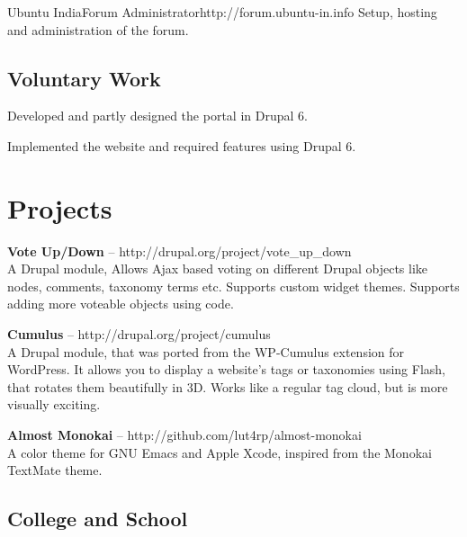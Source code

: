 \documentclass[11pt,a4paper]{moderncv}
\begin{document}
{Ubuntu India}{Forum Administrator}{}{http://forum.ubuntu-in.info}
{Setup, hosting and administration of the forum.}

\subsection{Voluntary Work}

{Developed and partly designed the portal in Drupal 6.}

{Implemented the website and required features using Drupal 6.}



\pagebreak
\section{Projects}

\cvlistitem
{\textbf{Vote Up/Down} -- {\small http://drupal.org/project/vote\_up\_down}
  \\A Drupal module, Allows Ajax based voting on different Drupal objects like nodes, comments, taxonomy terms etc. Supports custom widget themes. Supports adding more voteable objects using code.\\
}

\cvlistitem
{\textbf{Cumulus} -- {\small http://drupal.org/project/cumulus}
  \\A Drupal module, that was ported from the WP-Cumulus extension for WordPress. It allows you to display a website's tags or taxonomies using Flash, that rotates them beautifully in 3D. Works like a regular tag cloud, but is more visually exciting.\\
}

\cvlistitem
{\textbf{Almost Monokai} -- {\small http://github.com/lut4rp/almost-monokai}
  \\A color theme for GNU Emacs and Apple Xcode, inspired from the Monokai TextMate theme.\\
}

\subsection{College and School}
\end{document}
